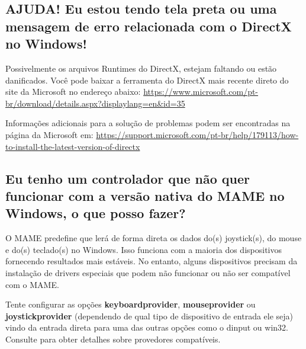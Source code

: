 \documentclass[letterpaper,10pt,brazil]{sphinxmanual}
\begin{document}
\subsection{AJUDA! Eu estou tendo tela preta ou uma mensagem de erro relacionada com o DirectX no Windows!}
\label{usingmame/commonissues:ajuda-eu-estou-tendo-tela-preta-ou-uma-mensagem-de-erro-relacionada-com-o-directx-no-windows}\label{usingmame/commonissues:blackscreen-directx}
Possivelmente os arquivos Runtimes do DirectX, estejam faltando ou estão
danificados. Você pode baixar a ferramenta do DirectX mais recente
direto do site da Microsoft no endereço abaixo:
\url{https://www.microsoft.com/pt-br/download/details.aspx?displaylang=en\&id=35}

Informações adicionais para a solução de problemas podem ser encontradas
na página da Microsoft em:
\url{https://support.microsoft.com/pt-br/help/179113/how-to-install-the-latest-version-of-directx}


\subsection{Eu tenho um controlador que não quer funcionar com a versão nativa do MAME no Windows, o que posso fazer?}
\label{usingmame/commonissues:controllerissues}\label{usingmame/commonissues:eu-tenho-um-controlador-que-nao-quer-funcionar-com-a-versao-nativa-do-mame-no-windows-o-que-posso-fazer}
O MAME predefine que lerá de forma direta os dados do(s) joystick(s), do
mouse e do(s) teclado(s) no Windows. Isso funciona com a maioria dos
dispositivos fornecendo resultados mais estáveis. No entanto, alguns
dispositivos precisam da instalação de drivers especiais que podem não
funcionar ou não ser compatível com o MAME.

Tente configurar as opções \textbf{keyboardprovider}, \textbf{mouseprovider} ou
\textbf{joystickprovider} (dependendo de qual tipo de dispositivo de entrada
ele seja) vindo da entrada direta para uma das outras opções como o
dinput ou win32. Consulte {\hyperref[commandline/commandline\string-all:osd\string-commandline\string-options]{}} para obter
detalhes sobre provedores compatíveis.
\end{document}
